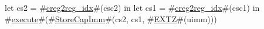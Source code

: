 let cs2 = #\hyperref[sailRISCVzcreg2regzyidx]{creg2reg\_idx}#(csc2) in
let cs1 = #\hyperref[sailRISCVzcreg2regzyidx]{creg2reg\_idx}#(csc1) in
#\hyperref[sailRISCVzexecute]{execute}#(#\hyperref[sailRISCVzStoreCapImm]{StoreCapImm}#(cs2, cs1, #\hyperref[sailRISCVzEXTZ]{EXTZ}#(uimm)))
